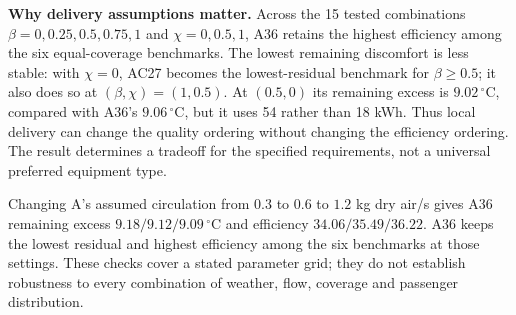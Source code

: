 \noindent\textbf{Why delivery assumptions matter.} Across the 15 tested combinations $\beta=0,0.25,0.5,0.75,1$ and $\chi=0,0.5,1$, A36 retains the highest efficiency among the six equal-coverage benchmarks. The lowest remaining discomfort is less stable: with $\chi=0$, AC27 becomes the lowest-residual benchmark for $\beta\ge0.5$; it also does so at $(\beta,\chi)=(1,0.5)$. At $(0.5,0)$ its remaining excess is $9.02\,^{\circ}\mathrm C$, compared with A36's $9.06\,^{\circ}\mathrm C$, but it uses 54 rather than 18 kWh. Thus local delivery can change the quality ordering without changing the efficiency ordering. The result determines a tradeoff for the specified requirements, not a universal preferred equipment type.

Changing A's assumed circulation from $0.3$ to $0.6$ to $1.2$ kg dry air/s gives A36 remaining excess $9.18/9.12/9.09\,^{\circ}\mathrm C$ and efficiency $34.06/35.49/36.22$. A36 keeps the lowest residual and highest efficiency among the six benchmarks at those settings. These checks cover a stated parameter grid; they do not establish robustness to every combination of weather, flow, coverage and passenger distribution.
